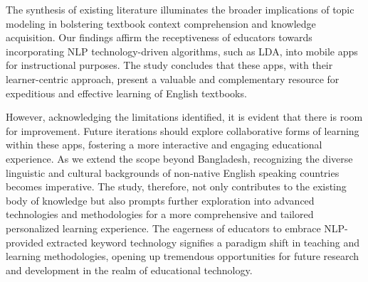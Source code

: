 \documentclass[sn-mathphys,Numbered]{sn-jnl}%
\theoremstyle{thmstyleone}%
\theoremstyle{thmstyletwo}%
\theoremstyle{thmstylethree}%
\begin{document}
The synthesis of existing literature illuminates the broader implications of topic modeling in bolstering textbook context comprehension and knowledge acquisition. Our findings affirm the receptiveness of educators towards incorporating NLP technology-driven algorithms, such as LDA, into mobile apps for instructional purposes. The study concludes that these apps, with their learner-centric approach, present a valuable and complementary resource for expeditious and effective learning of English textbooks.

However, acknowledging the limitations identified, it is evident that there is room for improvement. Future iterations should explore collaborative forms of learning within these apps, fostering a more interactive and engaging educational experience. As we extend the scope beyond Bangladesh, recognizing the diverse linguistic and cultural backgrounds of non-native English speaking countries becomes imperative. The study, therefore, not only contributes to the existing body of knowledge but also prompts further exploration into advanced technologies and methodologies for a more comprehensive and tailored personalized learning experience. The eagerness of educators to embrace NLP-provided extracted keyword technology signifies a paradigm shift in teaching and learning methodologies, opening up tremendous opportunities for future research and development in the realm of educational technology.


 \noindent
%


\end{document}
